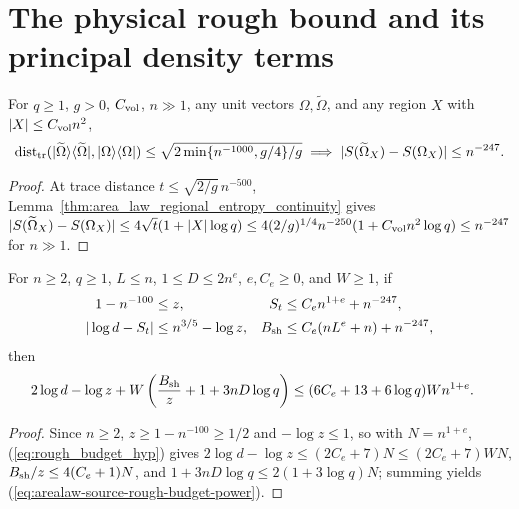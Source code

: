 \section{The physical rough bound and its principal density terms}
\label{sec:arealaw-source-rough-power}

\begin{lemma}
    \label{thm:arealaw-target-entropy-transfer}
    \leanok
    For $q\ge1$, $g>0$, $C_{\rm vol}$, $n\gg1$, any unit vectors $\Omega,\widetilde\Omega$, and any region $X$ with $|X|\le C_{\rm vol}n^2$,
    \begin{align}
        \operatorname{dist}_{\rm tr}
        (|\widetilde\Omega\rangle\langle\widetilde\Omega|,
        |\Omega\rangle\langle\Omega|)
        \le\sqrt{2\min\{n^{-1000},g/4\}/g}
        \implies
        |S(\widetilde\Omega_X)-S(\Omega_X)| \le n^{-247}.
        \label{eq:arealaw-target-entropy-transfer}
    \end{align}
\end{lemma}
\begin{proof}
    \leanok
    At trace distance $t\le\sqrt{2/g}\,n^{-500}$, Lemma~\ref{thm:area_law_regional_entropy_continuity} gives $|S(\widetilde\Omega_X)-S(\Omega_X)|\le4\sqrt t(1+|X|\log q)\le4(2/g)^{1/4}n^{-250}(1+C_{\rm vol}n^2\log q)\le n^{-247}$ for $n\gg1$.
\end{proof}

\begin{lemma}
    \label{thm:arealaw-source-rough-budget-power}
    \leanok
    For $n\ge2$, $q\ge1$, $L\le n$, $1\le D\le2n^e$, $e,C_e\ge0$, and $W\ge1$, if
    \begin{align}
        1-n^{-100}   & \le z,                                                &
        S_t          & \le C_en^{1+e}+n^{-247},\notag                          \\
        |\log d-S_t| & \le n^{3/5}-\log z,                                   &
        B_{\rm sh}   & \le C_e(nL^e+n)+n^{-247}, \label{eq:rough_budget_hyp}
    \end{align}
    then
    \begin{align}
        2\log d-\log z+
        W\left(\frac{B_{\rm sh}}z+1+3nD\log q\right)
         & \le(6C_e+13+6\log q)Wn^{1+e}.
        \label{eq:arealaw-source-rough-budget-power}
    \end{align}
\end{lemma}
\begin{proof}
    \leanok
    Since $n\ge2$, $z\ge1-n^{-100}\ge1/2$ and $-\log z\le1$, so with $N=n^{1+e}$, (\ref{eq:rough_budget_hyp}) gives $2\log d-\log z\le(2C_e+7)N\le(2C_e+7)WN$, $B_{\rm sh}/z\le4(C_e+1)N$, and $1+3nD\log q\le2(1+3\log q)N$; summing yields (\ref{eq:arealaw-source-rough-budget-power}).
\end{proof}

